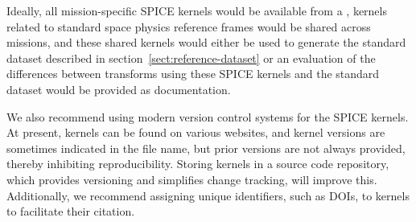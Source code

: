 \documentclass[draft]{agujournal2019}
\begin{document}


Ideally, all mission-specific SPICE kernels would be available from a , kernels related to standard space physics reference frames would be shared across missions, and these shared kernels would either be used to generate the standard dataset described in section~\ref{sect:reference-dataset} or an evaluation of the differences between transforms using these SPICE kernels and the standard dataset would be provided as documentation.

We also recommend using modern version control systems for the SPICE kernels. At present, kernels can be found on various websites, and kernel versions are sometimes indicated in the file name, but prior versions are not always provided, thereby inhibiting reproducibility. Storing kernels in a source code repository, which provides versioning and simplifies change tracking, will improve this. Additionally, we recommend assigning unique identifiers, such as DOIs, to kernels to facilitate their citation.







\end{document}
